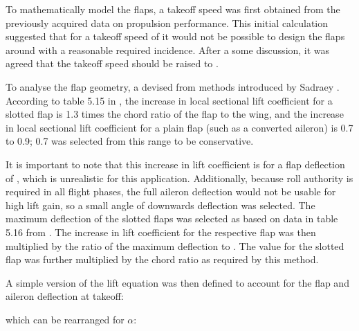 \documentclass[../../main.tex]{subfiles}
\begin{document}
To mathematically model the flaps, a takeoff speed was first obtained from the previously acquired data on propulsion performance.
This initial calculation suggested that for a takeoff speed of  it would not be possible to design the flaps around with a reasonable required incidence.
After a some discussion, it was agreed that the takeoff speed should be raised to . 

To analyse the flap geometry, a devised from methods introduced by Sadraey \cite{sadraey-13}.
According to table 5.15 in \cite{sadraey-13}, the increase in local sectional lift coefficient for a slotted flap is 1.3 times the chord ratio of the flap to the wing, and the increase in local sectional lift coefficient for a plain flap (such as a converted aileron) is 0.7 to 0.9; 0.7 was selected from this range to be conservative. 

It is important to note that this increase in lift coefficient is for a flap deflection of , which is unrealistic for this application.
Additionally, because roll authority is required in all flight phases, the full aileron deflection would not be usable for high lift gain, so a small angle of  downwards deflection was selected.
The maximum deflection of the slotted flaps was selected as  based on data in table 5.16 from \cite{sadraey-13}.
The increase in lift coefficient for the respective flap was then multiplied by the ratio of the maximum deflection to .
The value for the slotted flap was further multiplied by the chord ratio as required by this method. 

A simple version of the lift equation was then defined to account for the flap and aileron deflection at takeoff: 


which can be rearranged for $\alpha$:

\end{document}
